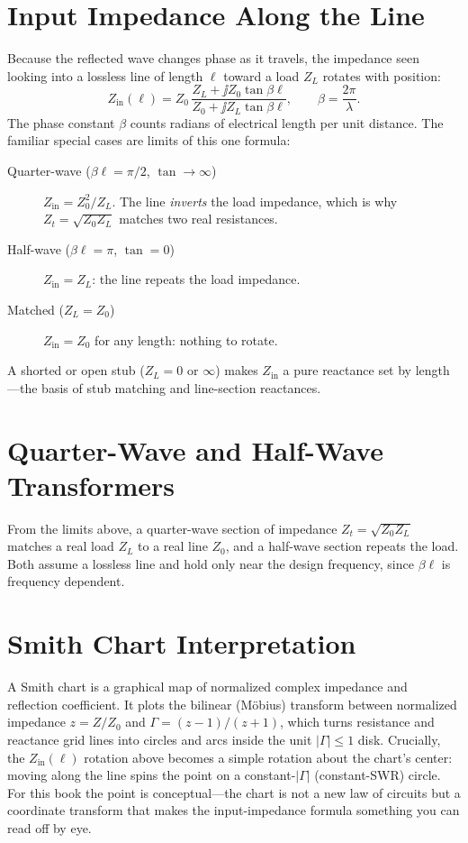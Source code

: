 \section{Input Impedance Along the Line}
Because the reflected wave changes phase as it travels, the impedance seen
looking into a lossless line of length \(\ell\) toward a load \(Z_L\) rotates with
position:
\[
Z_{\mathrm{in}}(\ell)=Z_0\,
\frac{Z_L+\jj Z_0\tan\beta\ell}{Z_0+\jj Z_L\tan\beta\ell},
\qquad
\beta=\frac{2\pi}{\lambda}.
\]
The phase constant \(\beta\) counts radians of electrical length per unit
distance. The familiar special cases are limits of this one formula:
\begin{description}
\item[Quarter-wave (\(\beta\ell=\pi/2\), \(\tan\to\infty\))]
\(Z_{\mathrm{in}}=Z_0^2/Z_L\). The line \emph{inverts} the load impedance, which
is why \(Z_t=\sqrt{Z_0 Z_L}\) matches two real resistances.
\item[Half-wave (\(\beta\ell=\pi\), \(\tan=0\))] \(Z_{\mathrm{in}}=Z_L\): the line
repeats the load impedance.
\item[Matched (\(Z_L=Z_0\))] \(Z_{\mathrm{in}}=Z_0\) for any length: nothing to
rotate.
\end{description}
A shorted or open stub (\(Z_L=0\) or \(\infty\)) makes \(Z_{\mathrm{in}}\) a pure
reactance set by length---the basis of stub matching and line-section reactances.

\section{Quarter-Wave and Half-Wave Transformers}
From the limits above, a quarter-wave section of impedance
\(Z_t=\sqrt{Z_0Z_L}\) matches a real load \(Z_L\) to a real line \(Z_0\), and a
half-wave section repeats the load. Both assume a lossless line and hold only near
the design frequency, since \(\beta\ell\) is frequency dependent.

\section{Smith Chart Interpretation}
A Smith chart is a graphical map of normalized complex impedance and reflection
coefficient. It plots the bilinear (M\"obius) transform between normalized
impedance \(z=Z/Z_0\) and \(\Gamma=(z-1)/(z+1)\), which turns resistance and
reactance grid lines into circles and arcs inside the unit \(|\Gamma|\le1\) disk.
Crucially, the \(Z_{\mathrm{in}}(\ell)\) rotation above becomes a simple rotation
about the chart's center: moving along the line spins the point on a
constant-\(|\Gamma|\) (constant-SWR) circle. For this book the point is
conceptual---the chart is not a new law of circuits but a coordinate transform
that makes the input-impedance formula something you can read off by eye.


